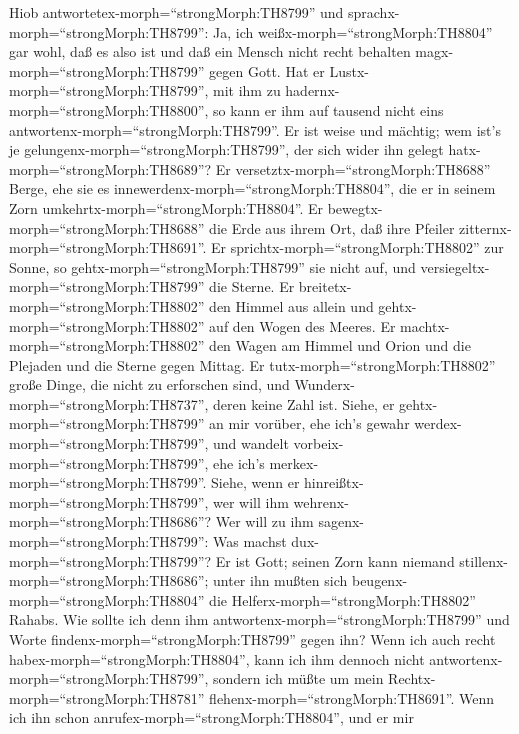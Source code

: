  Hiob antwortetex-morph=``strongMorph:TH8799'' und
sprachx-morph=``strongMorph:TH8799'':  Ja, ich
weißx-morph=``strongMorph:TH8804'' gar wohl, daß es also ist und daß ein
Mensch nicht recht behalten magx-morph=``strongMorph:TH8799'' gegen
Gott.  Hat er Lustx-morph=``strongMorph:TH8799'', mit ihm zu
hadernx-morph=``strongMorph:TH8800'', so kann er ihm auf tausend nicht
eins antwortenx-morph=``strongMorph:TH8799''.  Er ist weise
und mächtig; wem ist's je gelungenx-morph=``strongMorph:TH8799'', der
sich wider ihn gelegt hatx-morph=``strongMorph:TH8689''?  Er
versetztx-morph=``strongMorph:TH8688'' Berge, ehe sie es
innewerdenx-morph=``strongMorph:TH8804'', die er in seinem Zorn
umkehrtx-morph=``strongMorph:TH8804''.  Er
bewegtx-morph=``strongMorph:TH8688'' die Erde aus ihrem Ort, daß ihre
Pfeiler zitternx-morph=``strongMorph:TH8691''.  Er
sprichtx-morph=``strongMorph:TH8802'' zur Sonne, so
gehtx-morph=``strongMorph:TH8799'' sie nicht auf, und
versiegeltx-morph=``strongMorph:TH8799'' die Sterne.  Er
breitetx-morph=``strongMorph:TH8802'' den Himmel aus allein und
gehtx-morph=``strongMorph:TH8802'' auf den Wogen des Meeres.
 Er machtx-morph=``strongMorph:TH8802'' den Wagen am Himmel
und Orion und die Plejaden und die Sterne gegen Mittag.  Er
tutx-morph=``strongMorph:TH8802'' große Dinge, die nicht zu erforschen
sind, und Wunderx-morph=``strongMorph:TH8737'', deren keine Zahl ist.
 Siehe, er gehtx-morph=``strongMorph:TH8799'' an mir
vorüber, ehe ich's gewahr werdex-morph=``strongMorph:TH8799'', und
wandelt vorbeix-morph=``strongMorph:TH8799'', ehe ich's
merkex-morph=``strongMorph:TH8799''.  Siehe, wenn er
hinreißtx-morph=``strongMorph:TH8799'', wer will ihm
wehrenx-morph=``strongMorph:TH8686''? Wer will zu ihm
sagenx-morph=``strongMorph:TH8799'': Was machst
dux-morph=``strongMorph:TH8799''?  Er ist Gott; seinen Zorn
kann niemand stillenx-morph=``strongMorph:TH8686''; unter ihn mußten
sich beugenx-morph=``strongMorph:TH8804'' die
Helferx-morph=``strongMorph:TH8802'' Rahabs.  Wie sollte
ich denn ihm antwortenx-morph=``strongMorph:TH8799'' und Worte
findenx-morph=``strongMorph:TH8799'' gegen ihn?  Wenn ich
auch recht habex-morph=``strongMorph:TH8804'', kann ich ihm dennoch
nicht antwortenx-morph=``strongMorph:TH8799'', sondern ich müßte um mein
Rechtx-morph=``strongMorph:TH8781''
flehenx-morph=``strongMorph:TH8691''.  Wenn ich ihn schon
anrufex-morph=``strongMorph:TH8804'', und er mir
